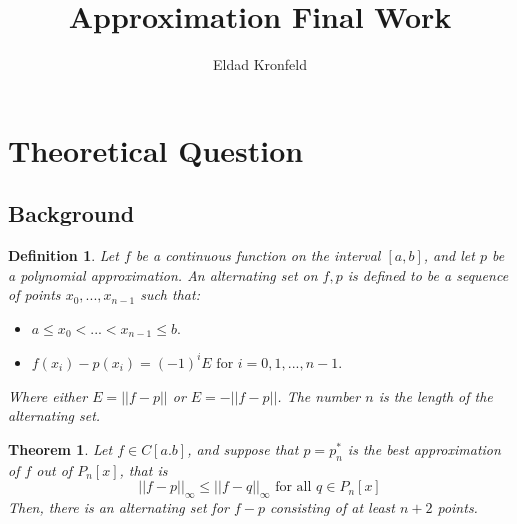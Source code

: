 \documentclass[]{article}
\title{Approximation Final Work}
\author{Eldad Kronfeld}
\date{}
\newtheorem{thm}{Theorem}[section]
\newtheorem{definition}{Definition}[]
\begin{document}
\maketitle
\tableofcontents

\newpage
\section{Theoretical Question }
\subsection{Background}
\begin{definition}
	\label{definition1}
	Let $f$ be a continuous function on the interval $[a, b]$, and let $p$ be a polynomial approximation. An alternating set on $f, p$ is defined to be a sequence of points $x_{0}, ..., x_{n-1}$ such that:
	\begin{itemize}
	\item $a \leq x_0 <...<x_{n - 1}\leq b .$
	\item $f(x_i) - p(x_i) = (-1)^i E \text{ for } i=0,1,...,n-1.$ 
\end{itemize}
Where either $E=||f-p||$ or $E=-||f-p||$. The number $n$ is the length of the alternating set.
\end{definition}


\begin{thm}
	\label{thm1}
	Let $f \in C[a.b]$, and suppose that $p=p^{*}_{n}$ is the best approximation of $f$ out of $P_{n}[x]$, that is
	\begin{equation}
		||f-p||_{\infty} \le ||f-q||_{\infty} \text{ for all } q\in P_{n}[x] 
	\end{equation}
	Then, there is an alternating set for $f-p$ consisting of at least $n+2$  points.
	
\end{thm}
\end{document}
